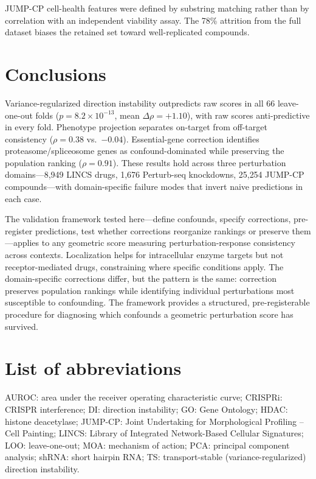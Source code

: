 \documentclass[11pt]{article}
\begin{document}
JUMP-CP cell-health features were defined by substring matching rather
than by correlation with an independent viability assay. The 78\% attrition
from the full dataset biases the retained set toward well-replicated
compounds.

\section{Conclusions}

Variance-regularized direction instability outpredicts raw scores in all 66
leave-one-out folds ($p = 8.2 \times 10^{-13}$, mean
$\Delta\rho = +1.10$), with raw scores anti-predictive in every fold.
Phenotype projection separates on-target from off-target consistency
($\rho = 0.38$ vs.\ $-0.04$). Essential-gene correction identifies
proteasome/spliceosome genes as confound-dominated while preserving the
population ranking ($\rho = 0.91$). These results hold across three
perturbation domains---8{,}949 LINCS drugs, 1{,}676 Perturb-seq
knockdowns, 25{,}254 JUMP-CP compounds---with domain-specific failure
modes that invert naive predictions in each case.

The validation framework tested here---define confounds, specify
corrections, pre-register predictions, test whether corrections reorganize
rankings or preserve them---applies to any geometric score measuring
perturbation-response consistency across contexts. Localization helps for
intracellular enzyme targets but not receptor-mediated drugs, constraining
where specific conditions apply. The domain-specific corrections differ,
but the pattern is the same: correction preserves population rankings while
identifying individual perturbations most susceptible to confounding. The
framework provides a structured, pre-registerable procedure for diagnosing
which confounds a geometric perturbation score has survived.

\section*{List of abbreviations}
AUROC: area under the receiver operating characteristic curve;
CRISPRi: CRISPR interference;
DI: direction instability;
GO: Gene Ontology;
HDAC: histone deacetylase;
JUMP-CP: Joint Undertaking for Morphological Profiling -- Cell Painting;
LINCS: Library of Integrated Network-Based Cellular Signatures;
LOO: leave-one-out;
MOA: mechanism of action;
PCA: principal component analysis;
shRNA: short hairpin RNA;
TS: transport-stable (variance-regularized) direction instability.
\end{document}
